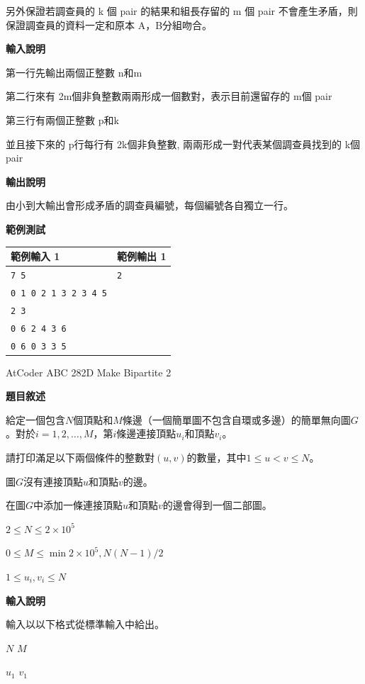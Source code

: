    另外保證若調查員的 k 個 pair 的結果和組長存留的 m 個 pair 不會產生矛盾，則保證調查員的資料一定和原本 
    A，B分組吻合。

    \textbf{輸入說明}

    第一行先輸出兩個正整數 
    n和m 

    第二行來有 
    2m個非負整數兩兩形成一個數對，表示目前還留存的 
    m個 pair

    第三行有兩個正整數 
    p和k 

    並且接下來的 
    p行每行有 
    2k個非負整數, 兩兩形成一對代表某個調查員找到的 
    k個 pair

    \textbf{輸出說明}

    由小到大輸出會形成矛盾的調查員編號，每個編號各自獨立一行。

    \textbf{範例測試}

    \begin{tabular}{|m{7cm}|m{7cm}|}
        \hline
        範例輸入 1 & 範例輸出 1 \\
        \hline
        \verb|7 5|  & \verb|2| \\
        \verb|0 1 0 2 1 3 2 3 4 5|  & \\
        \verb|2 3|  &\\
        \verb|0 6 2 4 3 6|  &\\
        \verb|0 6 0 3 3 5|  &\\
        \hline
    \end{tabular}

    \problem AtCoder ABC 282D Make Bipartite 2

    \textbf{題目敘述}

    給定一個包含$N$個頂點和$M$條邊（一個簡單圖不包含自環或多邊）的簡單無向圖$G$。對於$i=1,2,…,M$，第$i$條邊連接頂點$u_i$和頂點$v_i$。

    請打印滿足以下兩個條件的整數對$(u,v)$的數量，其中$1\leq u<v\leq N$。

    圖$G$沒有連接頂點$u$和頂點$v$的邊。

    在圖$G$中添加一條連接頂點$u$和頂點$v$的邊會得到一個二部圖。

    $2\leq N\leq 2\times 10^5$

    $0\leq M\leq \min{2\times 10^5, N(N-1)/2}$

    $1\leq u_i, v_i\leq N$

    \textbf{輸入說明}

    輸入以以下格式從標準輸入中給出。

    $N$ $M$

    $u_1$ $v_1$

